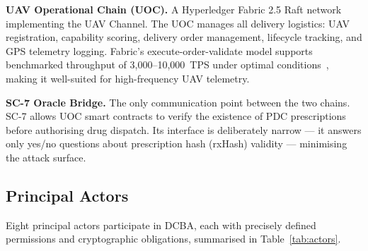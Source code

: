 \documentclass[sigplan,screen,review=false]{acmart}
\begin{document}
\textbf{UAV Operational Chain (UOC).} A Hyperledger Fabric 2.5 Raft
network implementing the UAV Channel. The UOC manages all delivery
logistics: UAV registration, capability scoring, delivery order
management, lifecycle tracking, and GPS telemetry logging. Fabric's
execute-order-validate model supports benchmarked throughput of
3,000--10,000~TPS under optimal conditions~\cite{androulaki2018hyperledger},
making it well-suited for high-frequency UAV telemetry.

\textbf{SC-7 Oracle Bridge.} The only communication point between the
two chains. SC-7 allows UOC smart contracts to verify the existence of
PDC prescriptions before authorising drug dispatch. Its interface is
deliberately narrow --- it answers only yes/no questions about
prescription hash (rxHash) validity --- minimising the attack surface.

\subsection{Principal Actors}

Eight principal actors participate in DCBA, each with precisely defined
permissions and cryptographic obligations, summarised in
Table~\ref{tab:actors}.
\end{document}
